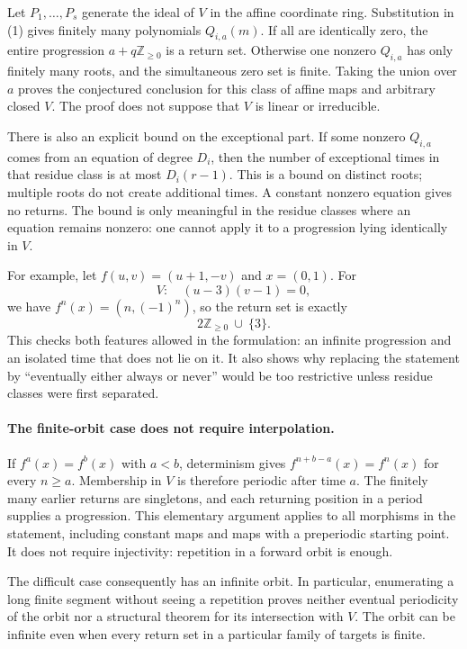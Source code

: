 \documentclass[11pt]{article}
\begin{document}
Let $P_1,\ldots,P_s$ generate the ideal of $V$ in the affine coordinate ring. Substitution in (1) gives finitely many polynomials $Q_{i,a}(m)$. If all are identically zero, the entire progression $a+q\mathbb Z_{\ge0}$ is a return set. Otherwise one nonzero $Q_{i,a}$ has only finitely many roots, and the simultaneous zero set is finite. Taking the union over $a$ proves the conjectured conclusion for this class of affine maps and arbitrary closed $V$. The proof does not suppose that $V$ is linear or irreducible.

There is also an explicit bound on the exceptional part. If some nonzero $Q_{i,a}$ comes from an equation of degree $D_i$, then the number of exceptional times in that residue class is at most $D_i(r-1)$. This is a bound on distinct roots; multiple roots do not create additional times. A constant nonzero equation gives no returns. The bound is only meaningful in the residue classes where an equation remains nonzero: one cannot apply it to a progression lying identically in $V$.

For example, let $f(u,v)=(u+1,-v)$ and $x=(0,1)$. For
\[
 V:\quad (u-3)(v-1)=0,
\]
we have $f^n(x)=(n,(-1)^n)$, so the return set is exactly
\[
 2\mathbb Z_{\ge0}\ \cup\ \{3\}.
\]
This checks both features allowed in the formulation: an infinite progression and an isolated time that does not lie on it. It also shows why replacing the statement by ``eventually either always or never'' would be too restrictive unless residue classes were first separated.

\paragraph{The finite-orbit case does not require interpolation.}
If $f^a(x)=f^b(x)$ with $a<b$, determinism gives $f^{n+b-a}(x)=f^n(x)$ for every $n\ge a$. Membership in $V$ is therefore periodic after time $a$. The finitely many earlier returns are singletons, and each returning position in a period supplies a progression. This elementary argument applies to all morphisms in the statement, including constant maps and maps with a preperiodic starting point. It does not require injectivity: repetition in a forward orbit is enough.

The difficult case consequently has an infinite orbit. In particular, enumerating a long finite segment without seeing a repetition proves neither eventual periodicity of the orbit nor a structural theorem for its intersection with $V$. The orbit can be infinite even when every return set in a particular family of targets is finite.
\end{document}
